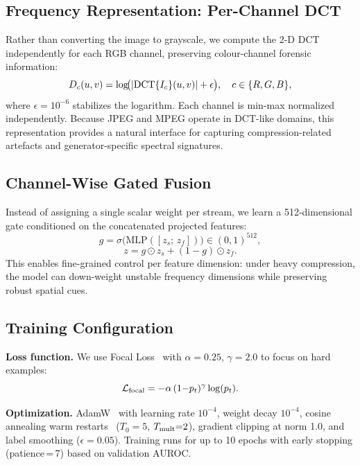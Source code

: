 \documentclass[conference]{IEEEtran}
\begin{document}
\subsection{Frequency Representation: Per-Channel DCT}
Rather than converting the image to grayscale, we compute the 2-D DCT independently for each RGB channel, preserving colour-channel forensic information:
\begin{equation}
  D_c(u,v) = \log\!\bigl(|{\rm DCT}\{I_c\}(u,v)| + \epsilon\bigr), \quad c\in\{R,G,B\},
  \label{eq:dct}
\end{equation}
where $\epsilon=10^{-6}$ stabilizes the logarithm. Each channel is min-max normalized independently. Because JPEG and MPEG operate in DCT-like domains, this representation provides a natural interface for capturing compression-related artefacts and generator-specific spectral signatures.

\subsection{Channel-Wise Gated Fusion}
Instead of assigning a single scalar weight per stream, we learn a 512-dimensional gate conditioned on the concatenated projected features:
\begin{equation}
  g = \sigma\!\bigl(\mathrm{MLP}([z_s;\, z_f])\bigr) \in (0,1)^{512},
  \label{eq:gate}
\end{equation}
\begin{equation}
  z = g \odot z_s + (1{-}g) \odot z_f.
  \label{eq:fusion}
\end{equation}
This enables fine-grained control per feature dimension: under heavy compression, the model can down-weight unstable frequency dimensions while preserving robust spatial cues.

\subsection{Training Configuration}

\textbf{Loss function.}
We use Focal Loss~\cite{lin2017focal} with $\alpha=0.25$, $\gamma=2.0$ to focus on hard examples:
\begin{equation}
  \mathcal{L}_{\rm focal} = -\alpha\,(1{-}p_t)^{\gamma}\log(p_t).
\end{equation}

\textbf{Optimization.}
AdamW~\cite{loshchilov2019adamw} with learning rate $10^{-4}$, weight decay $10^{-4}$, cosine annealing warm restarts~\cite{loshchilov2017sgdr} ($T_0{=}5$, $T_{\rm mult}{=}2$), gradient clipping at norm 1.0, and label smoothing ($\epsilon{=}0.05$).
Training runs for up to 10 epochs with early stopping (patience\,=\,7) based on validation AUROC.
\end{document}
